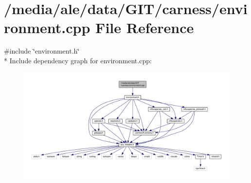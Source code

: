 \hypertarget{a00029}{\section{/media/ale/data/\-G\-I\-T/carness/environment.cpp File Reference}
\label{a00029}
}
{\ttfamily \#include \char`\"{}environment.\-h\char`\"{}}\\*
Include dependency graph for environment.\-cpp\-:\nopagebreak
\begin{figure}[H]
\begin{center}
\leavevmode
\includegraphics[width=350pt]{a00058}
\end{center}
\end{figure}
